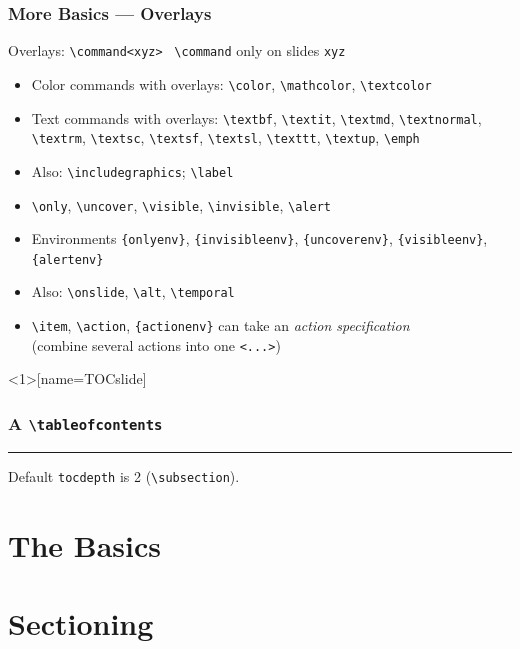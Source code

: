 \documentclass{ltx-talk}
\newcommand{\cs}[1]{\texttt{\textbackslash #1}}
\newcommand{\tubbraced}[1]{\texttt{\{#1\}}}
\begin{document}
\begin{frame*}
\frametitle{More Basics --- Overlays}
Overlays: \verb|\command<xyz>| \textrightarrow\ \cs{command}
only on slides \verb|xyz|\bigskip
\begin{itemize}
\item Color commands with overlays: \cs{color}, \cs{mathcolor}, \cs{textcolor}
\item Text commands with overlays: \cs{textbf}, \cs{textit},
\cs{textmd}, \cs{textnormal}, \cs{textrm}, \cs{textsc}, \cs{textsf}, \cs{textsl}, \cs{texttt}, \cs{textup},
\cs{emph}
\item Also: \cs{includegraphics}; \cs{label}
\item[\Large\star] \cs{only}, \cs{uncover}, \cs{visible}, \cs{invisible},
\cs{alert}
\item Environments \tubbraced{onlyenv}, \tubbraced{invisibleenv},
\tubbraced{uncoverenv}, \tubbraced{visibleenv}, \tubbraced{alertenv}
\item Also: \cs{onslide}, \cs{alt}, \cs{temporal}
\item \cs{item}, \cs{action}, \tubbraced{actionenv} can take an
\emph{action specification}\\
(combine several \textcolor{structure}{\Large\star} actions
into one \verb|<...>|)
\end{itemize}
\end{frame*}

\begin{frame}<1>[name=TOCslide]
\frametitle{A \cs{tableofcontents}\only<2>{ in a \cs{section}}}
\tableofcontents
\hrule\bigskip
Default \texttt{tocdepth} is 2 (\cs{subsection}).
\end{frame}

\section{The Basics}

\section{Sectioning}
\end{document}
